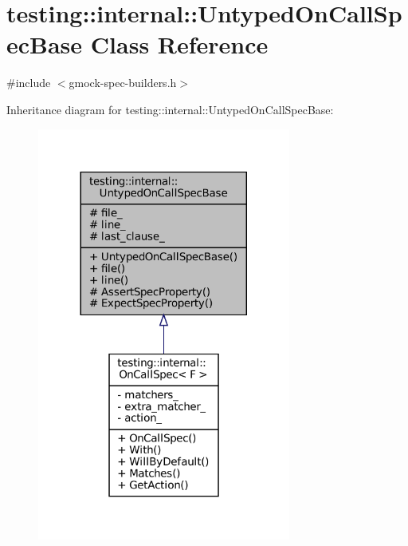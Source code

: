 \hypertarget{classtesting_1_1internal_1_1UntypedOnCallSpecBase}{}\section{testing\+:\+:internal\+:\+:Untyped\+On\+Call\+Spec\+Base Class Reference}
\label{classtesting_1_1internal_1_1UntypedOnCallSpecBase}


{\ttfamily \#include $<$gmock-\/spec-\/builders.\+h$>$}



Inheritance diagram for testing\+:\+:internal\+:\+:Untyped\+On\+Call\+Spec\+Base\+:
\nopagebreak
\begin{figure}[H]
\begin{center}
\leavevmode
\includegraphics[width=236pt]{classtesting_1_1internal_1_1UntypedOnCallSpecBase__inherit__graph}
\end{center}
\end{figure}


